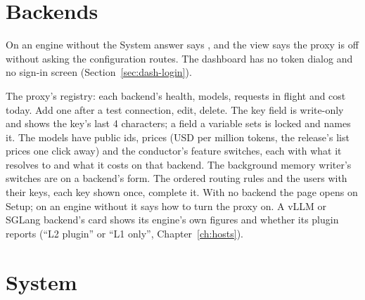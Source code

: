 

\section{Backends}

On an engine without  the System answer says , and the view says the proxy is off without asking the configuration routes. The dashboard has no token dialog and no sign-in screen (Section~\ref{sec:dash-login}).


The proxy's registry: each backend's health, models, requests in flight and cost today. Add one after a test connection, edit, delete. The key field is write-only and shows the key's last 4 characters; a field a  variable sets is locked and names it. The models have public ids, prices (USD per million tokens, the release's list prices one click away) and the conductor's feature switches, each with what it resolves to and what it costs on that backend. The background memory writer's switches are on a backend's form. The ordered routing rules and the users with their keys, each key shown once, complete it. With no backend the page opens on Setup; on an engine without  it says how to turn the proxy on. A vLLM or SGLang backend's card shows its engine's own figures and whether its plugin reports (\enquote{L2 plugin} or \enquote{L1 only}, Chapter~\ref{ch:hosts}).

\section{System}

